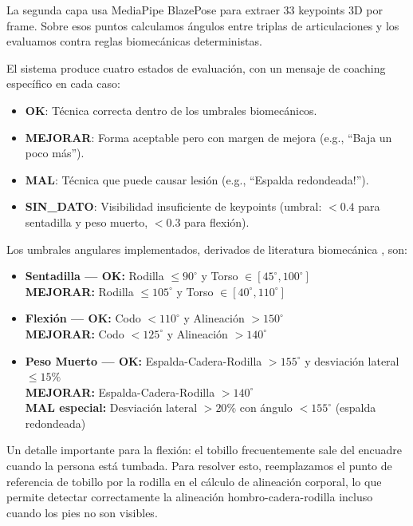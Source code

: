\documentclass[conference]{IEEEtran}
\begin{document}
La segunda capa usa MediaPipe BlazePose \cite{ref4} para extraer 33 keypoints 3D por frame. Sobre esos puntos calculamos ángulos entre triplas de articulaciones y los evaluamos contra reglas biomecánicas deterministas.

El sistema produce cuatro estados de evaluación, con un mensaje de coaching específico en cada caso:
\begin{itemize}
    \item \textbf{OK}: Técnica correcta dentro de los umbrales biomecánicos.
    \item \textbf{MEJORAR}: Forma aceptable pero con margen de mejora (e.g., ``Baja un poco más'').
    \item \textbf{MAL}: Técnica que puede causar lesión (e.g., ``Espalda redondeada!'').
    \item \textbf{SIN\_DATO}: Visibilidad insuficiente de keypoints (umbral: $< 0.4$ para sentadilla y peso muerto, $< 0.3$ para flexión).
\end{itemize}

Los umbrales angulares implementados, derivados de literatura biomecánica \cite{ref1}, son:

\begin{itemize}
    \item \textbf{Sentadilla — OK:} Rodilla $\leq 90^\circ$ y Torso $\in [45^\circ, 100^\circ]$\\
          \textbf{MEJORAR:} Rodilla $\leq 105^\circ$ y Torso $\in [40^\circ, 110^\circ]$
    \item \textbf{Flexión — OK:} Codo $< 110^\circ$ y Alineación $> 150^\circ$\\
          \textbf{MEJORAR:} Codo $< 125^\circ$ y Alineación $> 140^\circ$
    \item \textbf{Peso Muerto — OK:} Espalda-Cadera-Rodilla $> 155^\circ$ y desviación lateral $\leq 15\%$\\
          \textbf{MEJORAR:} Espalda-Cadera-Rodilla $> 140^\circ$\\
          \textbf{MAL especial:} Desviación lateral $> 20\%$ con ángulo $< 155^\circ$ (espalda redondeada)
\end{itemize}

Un detalle importante para la flexión: el tobillo frecuentemente sale del encuadre cuando la persona está tumbada. Para resolver esto, reemplazamos el punto de referencia de tobillo por la rodilla en el cálculo de alineación corporal, lo que permite detectar correctamente la alineación hombro-cadera-rodilla incluso cuando los pies no son visibles.
\end{document}
